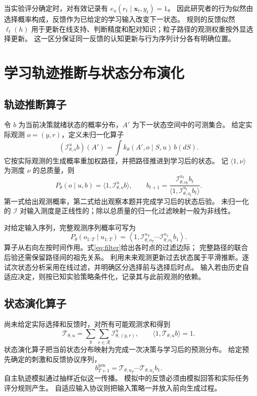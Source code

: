 \documentclass[11pt,a4paper]{article}
\numberwithin{equation}{section}
\newcommand{\Rr}{\mathcal{R}}
\newcommand{\Ii}{\mathcal{I}}
\newcommand{\Tt}{\mathcal{T}}
\begin{document}
当实验评分确定时，对有效记录有 $e_u(r_t\mid\bm x_t,y_t)=1$。
因此研究者的行为似然由选择概率构成，反馈作为已给定的学习输入改变下一状态。
规则的反馈似然 $\ell_t(h)$ 用于更新在线支持、判断精度和配对知识；粒子路径的观测权重按外显选择更新。
这一区分保证同一反馈的认知更新与行为序列计分各有明确位置。

\section{学习轨迹推断与状态分布演化}
\label{sec:operators}

\subsection{轨迹推断算子}
令 $b$ 为当前决策就绪状态的概率分布，$A'$ 为下一状态空间中的可测集合。
给定实际观测 $o=(y,r)$，定义未归一化算子
\begin{equation}
(\Ii_{\theta,o}^{u}b)(A')=\int k_\theta(A',o\mid S,u)\,b(dS).
\label{eq:inference}
\end{equation}
它按实际观测的生成概率重加权路径，并把路径推进到学习后的状态。
记 $\langle1,\nu\rangle$ 为测度 $\nu$ 的总质量，则
\begin{equation}
P_\theta(o\mid u,b)=\langle1,\Ii_{\theta,o}^{u}b\rangle,\qquad
b_{t+1}=\frac{\Ii_{\theta,o_t}^{u_t}b_t}
{\langle1,\Ii_{\theta,o_t}^{u_t}b_t\rangle}.
\label{eq:filter}
\end{equation}
第一式给出观测概率，第二式给出观察本题并完成学习后的状态后验。
未归一化的 $\Ii$ 对输入测度是正线性的；除以总质量的归一化过滤映射一般为非线性。

对给定输入序列，完整观测序列概率可写为
\begin{equation}
P_\theta(o_{1:T}\mid u_{1:T})=
\left\langle1,\Ii_{\theta,o_T}^{u_T}\cdots\Ii_{\theta,o_1}^{u_1}b_1\right\rangle.
\label{eq:sequence-operator}
\end{equation}
算子从右向左按时间作用。式\eqref{eq:filter}给出各时点的过滤边际；
完整路径的联合后验还需保留路径间的祖先关系。
利用未来观测更新过去状态属于平滑推断。逐试次状态分析采用在线过滤，并明确区分选择前与选择后时点。
输入若由历史自适应决定，则按已知实验策略条件化，记录其与此前观测的依赖。

\subsection{状态演化算子}
尚未给定实际选择和反馈时，对所有可能观测求和得到
\begin{equation}
\Tt_{\theta,u}=\sum_y\sum_{r\in\Rr}\Ii_{\theta,(y,r)}^{u},\qquad
\langle1,\Tt_{\theta,u}b\rangle=1.
\label{eq:evolution}
\end{equation}
状态演化算子把当前状态分布映射为完成一次决策与学习后的预测分布。
给定预先确定的刺激和反馈协议序列，
\begin{equation}
b_{T+1}^{\mathrm{gen}}=\Tt_{\theta,u_T}\cdots\Tt_{\theta,u_1}b_1.
\end{equation}
自主轨迹模拟通过抽样近似这一传播。
模拟中的反馈必须由模拟回答和实际任务评分规则产生。
自适应输入协议则把输入策略一并放入前向生成过程。
\end{document}
